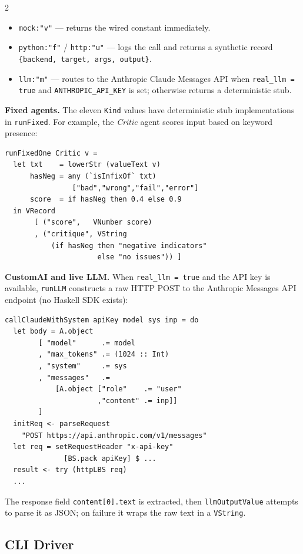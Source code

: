 \documentclass[10pt]{article}
\begin{document}
\begin{multicols}{2}
\begin{itemize}
  \item \texttt{mock:"v"} --- returns the wired constant immediately.
  \item \texttt{python:"f"} / \texttt{http:"u"} --- logs the call
        and returns a synthetic record
        \texttt{\{backend, target, args, output\}}.
  \item \texttt{llm:"m"} --- routes to the Anthropic Claude Messages
        API when \texttt{real\_llm = true} and
        \texttt{ANTHROPIC\_API\_KEY} is set; otherwise returns a
        deterministic stub.
\end{itemize}

\noindent\textbf{Fixed agents.}  The eleven \texttt{Kind} values have
deterministic stub implementations in \texttt{runFixed}.  For example,
the \textit{Critic} agent scores input based on keyword presence:

\begin{lstlisting}[style=hs]
runFixedOne Critic v =
  let txt    = lowerStr (valueText v)
      hasNeg = any (`isInfixOf` txt)
                ["bad","wrong","fail","error"]
      score  = if hasNeg then 0.4 else 0.9
  in VRecord
       [ ("score",   VNumber score)
       , ("critique", VString
           (if hasNeg then "negative indicators"
                      else "no issues")) ]
\end{lstlisting}

\noindent\textbf{CustomAI and live LLM.}  When \texttt{real\_llm = true}
and the API key is available, \texttt{runLLM} constructs a raw HTTP
POST to the Anthropic Messages API endpoint (no Haskell SDK exists):

\begin{lstlisting}[style=hs]
callClaudeWithSystem apiKey model sys inp = do
  let body = A.object
        [ "model"      .= model
        , "max_tokens" .= (1024 :: Int)
        , "system"     .= sys
        , "messages"   .=
            [A.object ["role"    .= "user"
                      ,"content" .= inp]]
        ]
  initReq <- parseRequest
    "POST https://api.anthropic.com/v1/messages"
  let req = setRequestHeader "x-api-key"
              [BS.pack apiKey] $ ...
  result <- try (httpLBS req)
  ...
\end{lstlisting}

The response field \texttt{content[0].text} is extracted, then
\texttt{llmOutputValue} attempts to parse it as JSON; on failure it
wraps the raw text in a \texttt{VString}.

\subsection{CLI Driver}


\end{multicols}
\end{document}

